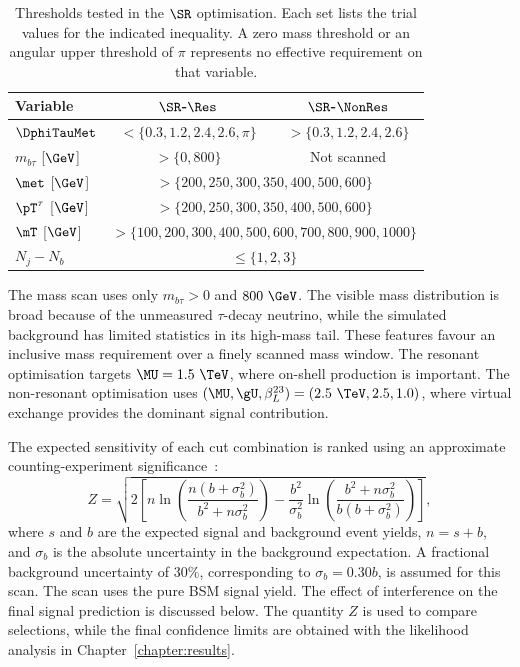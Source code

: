 \begin{table}[htbp]
    \centering
    \small
    \caption{Thresholds tested in the $\SR$ optimisation. Each set lists the trial values for the indicated inequality. A zero mass threshold or an angular upper threshold of $\pi$ represents no effective requirement on that variable.}
    \label{tab:ch7_scan_variables}
    \begin{tabular}{lcc}
        \toprule
        Variable & $\SR$-$\Res$ & $\SR$-$\NonRes$ \\
        \midrule
        $\DphiTauMet$ & $<\{0.3,1.2,2.4,2.6,\pi\}$ & $>\{0.3,1.2,2.4,2.6\}$ \\
        $m_{b\tau}$ [$\GeV$] & $>\{0,800\}$ & Not scanned \\
        $\met$ [$\GeV$] & \multicolumn{2}{c}{$>\{200,250,300,350,400,500,600\}$} \\
        $\pT^\tau$ [$\GeV$] & \multicolumn{2}{c}{$>\{200,250,300,350,400,500,600\}$} \\
        $\mT$ [$\GeV$] & \multicolumn{2}{c}{$>\{100,200,300,400,500,600,700,800,900,1000\}$} \\
        $N_j-N_b$ & \multicolumn{2}{c}{$\leq\{1,2,3\}$} \\
        \bottomrule
    \end{tabular}
\end{table}

The mass scan uses only $m_{b\tau}>0$ and $800~\GeV$.
The visible mass distribution is broad because of the unmeasured $\tau$-decay neutrino, while the simulated background has limited statistics in its high-mass tail.
These features favour an inclusive mass requirement over a finely scanned mass window.
The resonant optimisation targets $\MU=1.5~\TeV$, where on-shell production is important.
The non-resonant optimisation uses $(\MU,\gU,\beta_L^{23})=(2.5~\TeV,2.5,1.0)$, where virtual exchange provides the dominant signal contribution.

The expected sensitivity of each cut combination is ranked using an approximate counting-experiment significance~\cite{ATL-PHYS-PUB-2020-025}:
\begin{equation}
    Z = \sqrt{2\left[n\ln\!\left(\frac{n(b+\sigma_b^2)}{b^2+n\sigma_b^2}\right)-\frac{b^2}{\sigma_b^2}\ln\!\left(\frac{b^2+n\sigma_b^2}{b(b+\sigma_b^2)}\right)\right]},
    \label{eq:ch7_optimisation_significance}
\end{equation}
where $s$ and $b$ are the expected signal and background event yields, $n=s+b$, and $\sigma_b$ is the absolute uncertainty in the background expectation.
A fractional background uncertainty of $30\%$, corresponding to $\sigma_b=0.30b$, is assumed for this scan.
The scan uses the pure BSM signal yield.
The effect of interference on the final signal prediction is discussed below.
The quantity $Z$ is used to compare selections, while the final confidence limits are obtained with the likelihood analysis in Chapter~\ref{chapter:results}.


